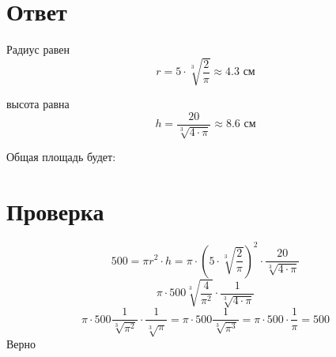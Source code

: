 \documentclass{article}
\begin{document}
\section{Ответ}
Радиус равен
$$r=5\cdot{}\sqrt[3]{\frac{2}{\pi}}\approx{}4.3\textrm{ см}$$

высота равна
$$h=\frac{20}{\sqrt[3]{4\cdot\pi}}\approx{}8.6\textrm{ см}$$

Общая площадь будет:

\section{Проверка}
$$500=\pi{}r^2\cdot{}h=\pi\cdot{}\left(5\cdot{}\sqrt[3]{\frac{2}{\pi}}\right)^2\cdot{}\frac{20}{\sqrt[3]{4\cdot\pi}}$$
$$\pi\cdot{}500\sqrt[3]{\frac{4}{\pi^2}}\cdot{}\frac{1}{\sqrt[3]{4\cdot\pi}}$$
$$\pi\cdot{}500\frac{1}{\sqrt[3]{\pi^2}}\cdot{}\frac{1}{\sqrt[3]{\pi}}=\pi\cdot{}500\frac{1}{\sqrt[3]{\pi^3}}=\pi\cdot{}500\cdot\frac{1}{\pi}=500$$
Верно


\end{document}
